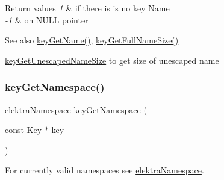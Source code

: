 \begin{DoxyRetVals}{Return values}
{\em 1} & if there is is no key Name \\
\hline
{\em -\/1} & on N\+U\+LL pointer \\
\hline
\end{DoxyRetVals}
\begin{DoxySeeAlso}{See also}
\mbox{\hyperlink{group__keyname_gab29a850168d9b31c9529e90cf9ab68be}{key\+Get\+Name()}}, \mbox{\hyperlink{group__keyname_gab65dc9d43d3ee08d5e936a20ebbddd23}{key\+Get\+Full\+Name\+Size()}} 

\mbox{\hyperlink{group__keyname_ga5e7eff0c77678420199d0d2e8729152b}{key\+Get\+Unescaped\+Name\+Size}} to get size of unescaped name 
\end{DoxySeeAlso}
\mbox{\label{group__keyname_gafc3ca03ed10f87eb59bdc02cf2a0de8d}} 
\subsubsection{\texorpdfstring{keyGetNamespace()}{keyGetNamespace()}}
{\footnotesize\ttfamily \mbox{\hyperlink{group__key_gaec3b8d6f430ae49b91bafe8a86310a68}{elektra\+Namespace}} key\+Get\+Namespace (\begin{DoxyParamCaption}\item[{const Key $\ast$}]{key }\end{DoxyParamCaption})}



For currently valid namespaces see \mbox{\hyperlink{group__key_gaec3b8d6f430ae49b91bafe8a86310a68}{elektra\+Namespace}}. 

